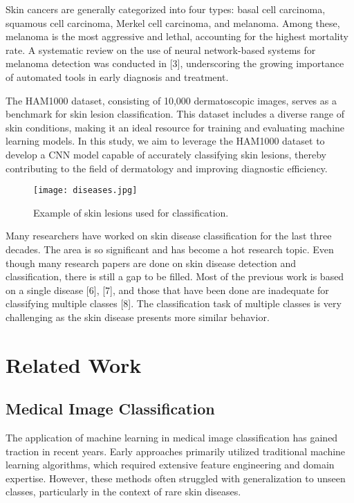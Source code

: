 \documentclass{article}
\begin{document}
Skin cancers are generally categorized into four types: basal cell carcinoma, squamous cell carcinoma, Merkel cell carcinoma, and melanoma. Among these, melanoma is the most aggressive and lethal, accounting for the highest mortality rate. A systematic review on the use of neural network-based systems for melanoma detection was conducted in [3], underscoring the growing importance of automated tools in early diagnosis and treatment.

The HAM1000 dataset, consisting of 10,000 dermatoscopic images, serves as a benchmark for skin lesion classification. This dataset includes a diverse range of skin conditions, making it an ideal resource for training and evaluating machine learning models. In this study, we aim to leverage the HAM1000 dataset to develop a CNN model capable of accurately classifying skin lesions, thereby contributing to the field of dermatology and improving diagnostic 
 efficiency.


\newpage  %
\begin{figure}[h!]
    \centering
    \texttt{[image: diseases.jpg]}
    \caption{Example of skin lesions used for classification.}
    \label{fig:skin_lesion_example}
\end{figure}


Many researchers have worked on skin disease classification for the last three decades. The area is so significant and has become a hot research topic. Even though many research papers are done on skin disease detection and classification, there is still a gap to be filled. Most of the previous work is based on a single disease [6], [7], and those that have been done are inadequate for classifying multiple classes [8]. The classification task of multiple classes is very challenging as the skin disease presents more similar behavior.

\section{Related Work}
\subsection{Medical Image Classification}
The application of machine learning in medical image classification has gained traction in recent years. Early approaches primarily utilized traditional machine learning algorithms, which required extensive feature engineering and domain expertise. However, these methods often struggled with generalization to unseen classes, particularly in the context of rare skin diseases.
\end{document}
